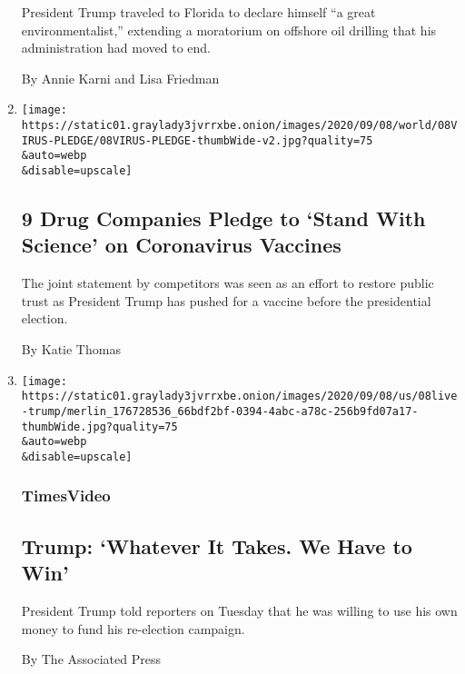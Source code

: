 \begin{enumerate}
  President Trump traveled to Florida to declare himself ``a great
  environmentalist,'' extending a moratorium on offshore oil drilling
  that his administration had moved to end.

  By Annie Karni and Lisa Friedman
\item
  \href{/2020/09/08/health/9-drug-companies-pledge-coronavirus-vaccine.html}{}

  \texttt{[image: https://static01.graylady3jvrrxbe.onion/images/2020/09/08/world/08VIRUS-PLEDGE/08VIRUS-PLEDGE-thumbWide-v2.jpg?quality=75\\\&auto=webp\\\&disable=upscale]}

  \hypertarget{9-drug-companies-pledge-to-stand-with-science-on-coronavirus-vaccines}{%
  \subsection{9 Drug Companies Pledge to `Stand With Science' on
  Coronavirus
  Vaccines}\label{9-drug-companies-pledge-to-stand-with-science-on-coronavirus-vaccines}}

  The joint statement by competitors was seen as an effort to restore
  public trust as President Trump has pushed for a vaccine before the
  presidential election.

  By Katie Thomas
\item
  \href{/video/us/elections/100000007329950/trump-presidential-campaign-funding.html}{}

  \texttt{[image: https://static01.graylady3jvrrxbe.onion/images/2020/09/08/us/08live-trump/merlin\_176728536\_66bdf2bf-0394-4abc-a78c-256b9fd07a17-thumbWide.jpg?quality=75\\\&auto=webp\\\&disable=upscale]}

  \hypertarget{timesvideo}{%
  \subsubsection{TimesVideo}\label{timesvideo}}

  \hypertarget{trump-whatever-it-takes-we-have-to-win}{%
  \subsection{Trump: `Whatever It Takes. We Have to
  Win'}\label{trump-whatever-it-takes-we-have-to-win}}

  President Trump told reporters on Tuesday that he was willing to use
  his own money to fund his re-election campaign.

  By The Associated Press
\end{enumerate}

